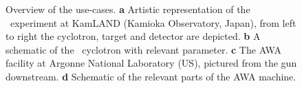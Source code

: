 \begin{figure}
{
}
\caption{Overview of the use-cases. \textbf{a} Artistic representation of the \isodar\ experiment at KamLAND (Kamioka Observatory, Japan), from left to right the cyclotron, target and detector are depicted. \textbf{b} A schematic of the \isodar\ cyclotron with relevant parameter. \textbf{c} The AWA facility at Argonne National Laboratory (US), pictured from the gun downstream. \textbf{d} Schematic of the relevant parts of the AWA machine.}
\label{fig:overview}
\end{figure}